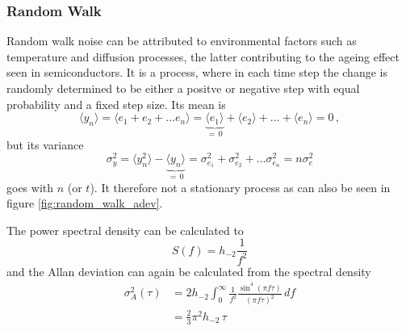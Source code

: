 \subsubsection{Random Walk}%
\label{sec:random_walk}
Random walk noise can be attributed to environmental factors such as temperature \cite{random_walk_fm} and diffusion processes, the latter contributing to the ageing effect seen in semiconductors.
It is a process, where in each time step the change is randomly determined to be either a positve or negative step with equal probability and a fixed step size. Its mean is
\begin{equation}
    \langle y_n \rangle = \langle e_1 + e_2 + \dots e_n \rangle = \underbrace{\langle e_1 \rangle}_{=\,0} + \langle e_2 \rangle + \dots + \langle e_n \rangle = 0 \, ,
\end{equation}
but its variance
\begin{equation}
    \sigma_y^2 = \langle y_n^2 \rangle - \underbrace{\langle y_n \rangle}_{=\,0} = \sigma_{e_1}^2 + \sigma_{e_2}^2 + \dots \sigma_{e_n}^2 = n \sigma_e^2
\end{equation}
goes with $n$ (or $t$). It therefore not a stationary process as can also be seen in figure \ref{fig:random_walk_adev}.

The power spectral density can be calculated \cite{psd_to_adev,noise_generation} to
\begin{equation}
    S(f) = h_{-2} \frac{1}{f^2}
\end{equation}
and the Allan deviation can again be calculated from the spectral density
\begin{align}
    \sigma_A^2(\tau) &= 2 h_{-2} \int_0^\infty \frac{1}{f^2} \frac{\sin^4\left( \pi f \tau \right)}{(\pi f \tau)^2}\,df \nonumber\\
    &=\frac{2}{3} \pi^2 h_{-2}\, \tau
\end{align}

